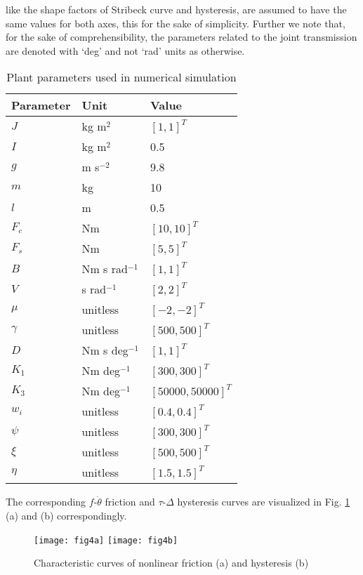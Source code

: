 \documentclass[a4paper, 10pt, conference]{ieeeconf}
\begin{document}
like the shape factors of Stribeck curve and hysteresis, are
assumed to have the same values for both axes, this for the sake
of simplicity. Further we note that, for the sake of
comprehensibility, the parameters related to the joint
transmission are denoted with `deg' and not `rad' units as
otherwise.
\begin{table}[!h]
  \renewcommand{\arraystretch}{1.3}
  \caption{Plant parameters used in numerical simulation}
 \label{tab:simparams}
  \begin{center}
  \begin{tabular} {|p{2cm}|p{2cm}|p{2cm}|}
  \hline
  Parameter         & Unit            & Value   \\[0.05cm]
  \hline \hline
  $J$                 & kg m$^2$        & $[1,1]^T$   \\
  $I$                 & kg m$^2$        & 0.5 \\
  $g$                 & m s$^{-2}$      & 9.8 \\
  $m$                 & kg              & 10 \\
  $l$                 & m               & 0.5 \\
  \hline
  $F_c$               & Nm              & $[10,10]^T$ \\
  $F_s$               & Nm              & $[5,5]^T$ \\
  $B$                 & Nm s rad$^{-1}$ & $[1, 1]^T$ \\
  $V$                 & s rad$^{-1}$    & $[2, 2]^T$ \\
  $\mu$               & unitless        & $[-2, -2]^T$ \\
  $\gamma$            & unitless        & $[500, 500]^T$ \\
  \hline
  $D$                 & Nm s deg$^{-1}$ & $[1, 1]^T$ \\
  $K_1$               & Nm deg$^{-1}$ & $[300, 300]^T$ \\
  $K_3$               & Nm deg$^{-1}$ & $[50000, 50000]^T$ \\
  $w_i$               & unitless        & $[0.4, 0.4]^T$ \\
  $\psi$              & unitless        & $[300, 300]^T$ \\
  $\xi$               & unitless        & $[500, 500]^T$ \\
  $\eta$              & unitless        & $[1.5, 1.5]^T$ \\
  \hline
  \end{tabular}
  \end{center}
  \normalsize
\end{table}
The corresponding $f$-$\dot{\theta}$ friction and $\tau$-$\Delta$
hysteresis curves are visualized in Fig. \ref{fig:nonlincurves}
(a) and (b) correspondingly.
\begin{figure}[!h]
\centering
\texttt{[image: fig4a]}
\texttt{[image: fig4b]}
\caption{Characteristic curves of nonlinear friction (a) and
hysteresis (b)} \label{fig:nonlincurves}
\end{figure}
\end{document}
